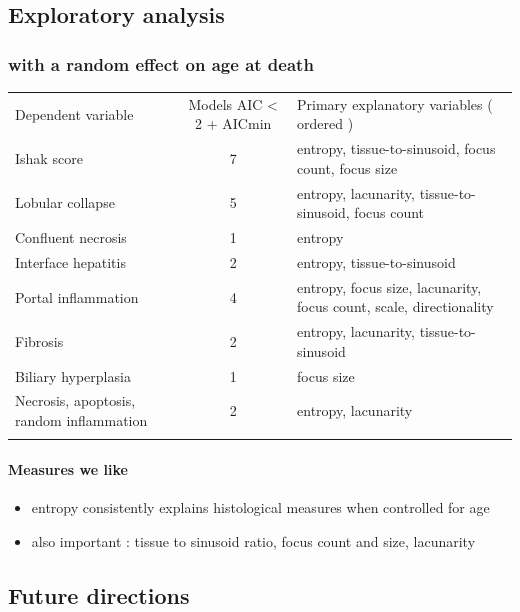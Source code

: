 \documentclass{article}
\begin{document}
    \subsection{Exploratory analysis}



    \subsubsection{with a random effect on age at death}


    \begin{longtable}[c]{@{}lcl@{}}
\toprule\addlinespace
Dependent variable & Models AIC \textless{} 2 + AICmin & Primary
explanatory variables ( ordered )
\\\addlinespace
\midrule\endhead
Ishak score & 7 & entropy, tissue-to-sinusoid, focus count, focus size
\\\addlinespace
Lobular collapse & 5 & entropy, lacunarity, tissue-to-sinusoid, focus
count
\\\addlinespace
Confluent necrosis & 1 & entropy
\\\addlinespace
Interface hepatitis & 2 & entropy, tissue-to-sinusoid
\\\addlinespace
Portal inflammation & 4 & entropy, focus size, lacunarity, focus count,
scale, directionality
\\\addlinespace
Fibrosis & 2 & entropy, lacunarity, tissue-to-sinusoid
\\\addlinespace
Biliary hyperplasia & 1 & focus size
\\\addlinespace
Necrosis, apoptosis, random inflammation & 2 & entropy, lacunarity
\\\addlinespace
\bottomrule
\end{longtable}


    \paragraph{Measures we like}


    \begin{itemize}
\itemsep1pt\parskip0pt
\item
  entropy consistently explains histological measures when controlled
  for age
\item
  also important : tissue to sinusoid ratio, focus count and size,
  lacunarity
\end{itemize}


    \subsection{Future directions}
\end{document}
